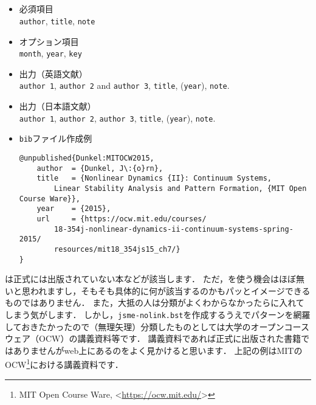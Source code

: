 \documentclass[a4paper,fleqn,uplatex,dvipdfmx]{jsarticle}
\newcommand{\jsmefile}{\texttt{jsme-nolink.bst}}
\begin{document}
\subsection{\ttunpublished}
\label{ssec:unpublished}
\begin{screen}
    \begin{itemize}
        \item 必須項目 \\
        \verb|author|, \verb|title|, \verb|note|
        \item オプション項目 \\
        \verb|month|, \verb|year|, \verb|key|
        \item 出力（英語文献） \\
            \colorbox[gray]{0.8}{\texttt{author 1}}, \colorbox[gray]{0.8}{\texttt{author 2}} and \colorbox[gray]{0.8}{\texttt{author 3}}, \colorbox[gray]{0.8}{\texttt{title}}, (\colorbox[gray]{0.8}{\texttt{year}}), \colorbox[gray]{0.8}{\texttt{note}}.
        \item 出力（日本語文献） \\
            \colorbox[gray]{0.8}{\texttt{author 1}}, \colorbox[gray]{0.8}{\texttt{author 2}}, \colorbox[gray]{0.8}{\texttt{author 3}}, \colorbox[gray]{0.8}{\texttt{title}}, (\colorbox[gray]{0.8}{\texttt{year}}), \colorbox[gray]{0.8}{\texttt{note}}.
        \item \verb|bib|ファイル作成例 \vspace{-3mm}
\begin{verbatim}
@unpublished{Dunkel:MITOCW2015,
    author  = {Dunkel, J\:{o}rn},
    title   = {Nonlinear Dynamics {II}: Continuum Systems, 
        Linear Stability Analysis and Pattern Formation, {MIT Open Course Ware}},
    year    = {2015},
    url     = {https://ocw.mit.edu/courses/
        18-354j-nonlinear-dynamics-ii-continuum-systems-spring-2015/
        resources/mit18_354js15_ch7/}
}
\end{verbatim}
    \end{itemize}
\end{screen}

\ttunpublished は正式には出版されていない本などが該当します．
ただ，\ttunpublished を使う機会はほぼ無いと思われますし，そもそも具体的に何が該当するのかもパッとイメージできるものではありません．
また，大抵の人は分類がよくわからなかったら\ttmisc に入れてしまう気がします．
しかし，\jsmefile を作成するうえでパターンを網羅しておきたかったので（無理矢理）分類したものとしては大学のオープンコースウェア（OCW）の講義資料等です．
講義資料であれば正式に出版された書籍ではありませんがweb上にあるのをよく見かけると思います．
上記の例はMITのOCW\footnote{MIT Open Course Ware, \textless\url{https://ocw.mit.edu/}\textgreater}における講義資料です．
\end{document}
